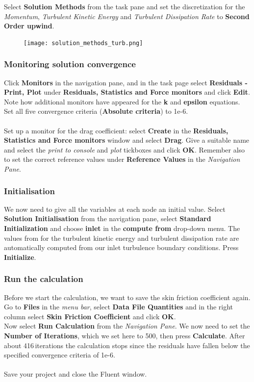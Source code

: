 \documentclass[11pt,a4paper,oneside]{scrartcl}
\newcommand\bfr[1]{\textcolor[rgb]{1,0.00,0.00}{\textbf{\textsf{#1}}}}
\begin{document}
Select \bfr{Solution Methods} from the task pane and set the discretization for the \emph{Momentum}, \emph{Turbulent Kinetic Energy} and \emph{Turbulent Dissipation Rate} to \bfr{Second Order upwind}.
\begin{figure}[H]
\begin{center}
\texttt{[image: solution\_methods\_turb.png]}
\end{center}
\end{figure}

\subsubsection{Monitoring solution convergence}

Click \bfr{Monitors} in the navigation pane, and in the task page select \bfr{Residuals - Print, Plot} under \bfr{Residuals, Statistics and Force monitors} and click \bfr{Edit}. Note how additional monitors have appeared for the \bfr{k} and \bfr{epsilon} equations. Set all five convergence criteria (\bfr{Absolute criteria}) to 1e-6.
\\
\\
Set up a monitor for the drag coefficient: select \bfr{Create} in the \bfr{Residuals, Statistics and Force monitors} window and select \bfr{Drag}. Give a suitable name and select the \emph{print to console} and \emph{plot} tickboxes and click \bfr{OK}. Remember also to set the correct reference values under \bfr{Reference Values} in the \emph{Navigation Pane}.

\subsubsection{Initialisation}

We now need to give all the variables at each node an initial value. Select \bfr{Solution Initialisation} from the navigation pane, select \bfr{Standard Initialization} and choose \bfr{inlet} in the \bfr{compute from} drop-down menu. The values from for the turbulent kinetic energy and turbulent dissipation rate are automatically computed from our inlet turbulence boundary conditions.
Press \bfr{Initialize}.


\subsubsection{Run the calculation}
Before we start the calculation, we want to save the skin friction coefficient again. Go to \bfr{Files} in the \emph{menu bar}, select \bfr{Data File Quantities} and in the right column select \bfr{Skin Friction Coefficient} and click \bfr{OK}.
\\
Now select \bfr{Run Calculation} from the \emph{Navigation Pane}. We now need to set the \bfr{Number of Iterations}, which we set here to 500, then press \bfr{Calculate}. After about 416\,iterations the calculation stops since the residuals have fallen below the specified convergence criteria of 1e-6.
\\
\\
Save your project and close the Fluent window.
\end{document}

